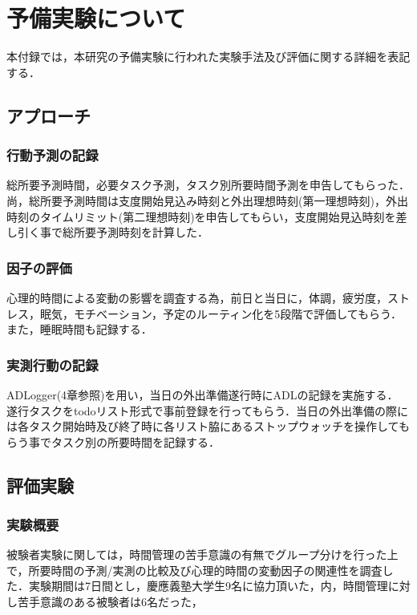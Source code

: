 \chapter{予備実験について}
本付録では，本研究の予備実験に行われた実験手法及び評価に関する詳細を表記する．
  \section{アプローチ}
\subsection{行動予測の記録}
総所要予測時間，必要タスク予測，タスク別所要時間予測を申告してもらった．尚，総所要予測時間は支度開始見込み時刻と外出理想時刻(第一理想時刻)，外出時刻のタイムリミット(第二理想時刻)を申告してもらい，支度開始見込時刻を差し引く事で総所要予測時刻を計算した．
\subsection{因子の評価}
心理的時間による変動の影響を調査する為，前日と当日に，体調，疲労度，ストレス，眠気，モチベーション，予定のルーティン化を5段階で評価してもらう．また，睡眠時間も記録する．
\subsection{実測行動の記録}
ADLogger(4章参照)を用い，当日の外出準備遂行時にADLの記録を実施する．
遂行タスクをtodoリスト形式で事前登録を行ってもらう．当日の外出準備の際には各タスク開始時及び終了時に各リスト脇にあるストップウォッチを操作してもらう事でタスク別の所要時間を記録する．

\section{評価実験}
\subsection{実験概要}
被験者実験に関しては，時間管理の苦手意識の有無でグループ分けを行った上で，所要時間の予測/実測の比較及び心理的時間の変動因子の関連性を調査した．実験期間は7日間とし，慶應義塾大学生9名に協力頂いた，内，時間管理に対し苦手意識のある被験者は6名だった，
